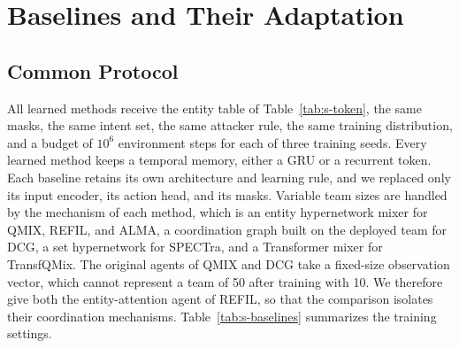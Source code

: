 \section{Baselines and Their Adaptation}
\label{sec:s-baselines}

\subsection{Common Protocol}
All learned methods receive the entity table of Table~\ref{tab:s-token}, the same masks, the same intent set, the same attacker rule, the same training distribution, and a budget of $10^6$ environment steps for each of three training seeds. Every learned method keeps a temporal memory, either a GRU or a recurrent token. Each baseline retains its own architecture and learning rule, and we replaced only its input encoder, its action head, and its masks. Variable team sizes are handled by the mechanism of each method, which is an entity hypernetwork mixer for QMIX, REFIL, and ALMA, a coordination graph built on the deployed team for DCG, a set hypernetwork for SPECTra, and a Transformer mixer for TransfQMix. The original agents of QMIX and DCG take a fixed-size observation vector, which cannot represent a team of 50 after training with 10. We therefore give both the entity-attention agent of REFIL, so that the comparison isolates their coordination mechanisms. Table~\ref{tab:s-baselines} summarizes the training settings.

